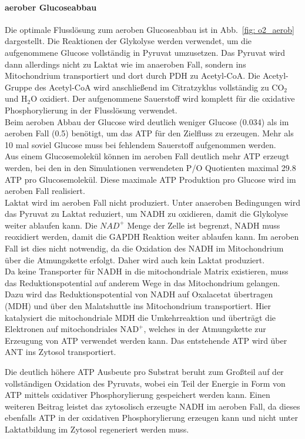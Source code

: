 \paragraph{aerober Glucoseabbau}
Die optimale Flusslösung zum aeroben Glucoseabbau ist in Abb.~\ref{fig: o2_aerob} dargestellt. Die Reaktionen der Glykolyse werden verwendet, um die aufgenommene Glucose vollständig in Pyruvat umzusetzen. Das Pyruvat wird dann allerdings nicht zu Laktat wie im anaeroben Fall, sondern ins Mitochondrium transportiert und dort durch PDH zu Acetyl-CoA. Die Acetyl-Gruppe des Acetyl-CoA wird anschließend im Citratzyklus vollständig zu $\text{CO}_2$ und $\text{H}_2\text{O}$ oxidiert. Der aufgenommene Sauerstoff wird komplett für die oxidative Phosphorylierung in der Flusslösung verwendet.\\
Beim aeroben Abbau der Glucose wird deutlich weniger Glucose (0.034) als im aeroben Fall (0.5) benötigt, um das ATP für den Zielfluss zu erzeugen. Mehr als 10 mal soviel Glucose muss bei fehlendem Sauerstoff aufgenommen werden.\\ 
Aus einem Glucosemolekül können im aeroben Fall deutlich mehr ATP erzeugt werden, bei den in den Simulationen verwendeten P/O Quotienten maximal 29.8 ATP pro Glucosemolekül. Diese maximale ATP Produktion pro Glucose wird im aeroben Fall realisiert.\\
Laktat wird im aeroben Fall nicht produziert. Unter anaeroben Bedingungen wird das Pyruvat zu Laktat reduziert, um NADH zu oxidieren, damit die Glykolyse weiter ablaufen kann. Die $NAD^+$ Menge der Zelle ist begrenzt, NADH muss reoxidiert werden, damit die GAPDH Reaktion weiter ablaufen kann. Im aeroben Fall ist dies nicht notwendig, da die Oxidation des NADH im Mitochondrium über die Atmungskette erfolgt. Daher wird auch kein Laktat produziert.\\
Da keine Transporter für NADH in die mitochondriale Matrix existieren, muss das Reduktionspotential auf anderem Wege in das Mitochondrium gelangen. Dazu wird das Reduktionspotential von NADH auf Oxalacetat übertragen (MDH) und über den Malatshuttle ins Mitochondrium transportiert. Hier katalysiert die mitochondriale MDH die Umkehrreaktion und überträgt die Elektronen auf mitochondriales $\text{NAD}^+$, welches in der Atmungskette zur Erzeugung von ATP verwendet werden kann. Das entstehende ATP wird über ANT ins Zytosol transportiert. 

Die deutlich höhere ATP Ausbeute pro Substrat beruht zum Großteil auf der vollständigen Oxidation des Pyruvats, wobei ein Teil der Energie in Form von ATP mittels oxidativer Phosphorylierung gespeichert werden kann. Einen weiteren Beitrag leistet das zytosolisch erzeugte NADH im aeroben Fall, da dieses ebenfalls ATP in der oxidativen Phosphorylierung erzeugen kann und nicht unter Laktatbildung im Zytosol regeneriert werden muss. 

